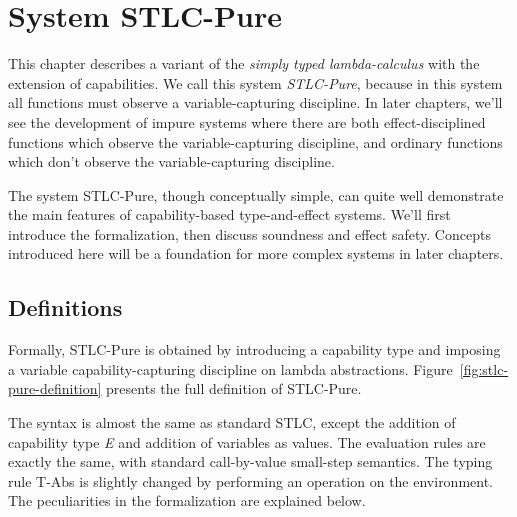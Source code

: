 \section{System STLC-Pure}

This chapter describes a variant of the \emph{simply typed
  lambda-calculus} with the extension of capabilities. We call this
system \emph{STLC-Pure}, because in this system all functions must
observe a variable-capturing discipline.  In later chapters, we'll see
the development of impure systems where there are both
effect-disciplined functions which observe the variable-capturing
discipline, and ordinary functions which don't observe the
variable-capturing discipline.

The system STLC-Pure, though conceptually simple, can quite well
demonstrate the main features of capability-based type-and-effect
systems. We'll first introduce the formalization, then discuss
soundness and effect safety. Concepts introduced here will be a
foundation for more complex systems in later chapters.

\subsection{Definitions}

Formally, STLC-Pure is obtained by introducing a capability type and
imposing a variable capability-capturing discipline on lambda
abstractions.  Figure~\ref{fig:stlc-pure-definition} presents the full
definition of STLC-Pure.

The syntax is almost the same as standard STLC, except the addition of
capability type \emph{E} and addition of variables as values. The
evaluation rules are exactly the same, with standard call-by-value
small-step semantics. The typing rule T-Abs is slightly changed by
performing an operation on the environment. The peculiarities in the
formalization are explained below.

